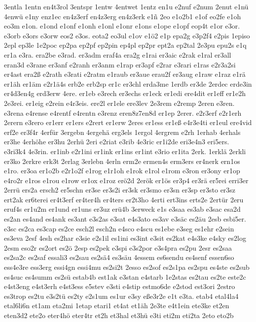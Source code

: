 {3entla
1entn
en4t3rol
3entspr
1entw
4entwet
1entz
en1u
e2nuf
e2num
2enut
e1nü
4enwü
e1ny
enz1ec
en4z3erf
en4z3erg
en4z3erk
e1ñ
2eo
e1o2b1
e1of
eo2fe
e1oh
eo3m
e1on.
e1ond
e1onf
e1onh
e1onl
e1onr
e1ons
e1ope
e1opf
eop4t
e1or
e3or.
e3orb
e3ors
e3orw
eos2
e3os.
eota2
eo3ul
e1ov
e1ö2
e1p
epa2g
e3p2f4
e2pis
1episo
2epl
ep3le
1e2poc
ep2pa
ep2pf
ep2pin
ep4pl
ep2pr
ept2a
ep2tal
2e3pu
epu2s
e1q
er1a
e3ra.
era2be
e3rad.
er3adm
eraf4a
era2g
e1rai
er3aic
e2rak
e1ral
er3all
eran3d
e3rane
er3anf
e2ranh
er3anm
e1rap
er3apf
e2rar
e3rari
e1ras
e2r3a2si
er4ast
era2ß
e2rath
e3rati
e2ratm
e1raub
er3aue
erau2f
er3aug
e1raw
e1raz
e1rä
er1äh
er1äm
e2r1ä4s
erb2e
erb2sp
er1c
er3chl
erda3me
1erdb
er3de
2erdec
erde3in
er4d3en4g
erd3erw
4ere.
er1eb
e3rech
er3echs
er1eck
er1edi
ere4dit
er1eff
er1e2h
2e3rei.
er1eig
e2rein
e4r3eis.
ere2l
er1ele
ere3lev
2e3rem
e2remp
2eren
e3ren.
e3rena
e4rense
e4rentf
e4rentn
e3renz
eren8z7en8d
er1ep
2erer.
e2r3erf
e2r1erh
2erern
e3rero
er1err
er1ers
e2rert
er1erw
2eres
er1ess
er1eß
e4r3e4ti
er1eul
ere4vid
erf2e
er3f4r
4erfür
3ergebn
4ergehä
erg3els
1ergol
4ergrem
e2rh
1erhab
4erhals
er3he
4erhöhe
er3hu
2erhü
2eri
e2riat
e3rib
4e3ric
er1i2de
eri3e4n3
eri5ers.
e3ri3k4
4e3rin.
er1inb
e2r1ini
er1ink
er1ins
er1int
e3rio
er1ita
2erk.
1erklä
2erkli
er3ko
2erkre
erk3t
2erlag
3erlebn
4erln
erm2e
ermen4s
erm3ers
er4nerk
ern1os
e1ro.
er3oa
er1o2b
e2r1o2f
e1rog
e1r1oh
e1rok
e1rol
e1rom
e3ron
er3ony
er1op
e4ro2r
e1ros
e1rou
e1row
er1ox
e1roz
erö2d
2erök
er1ös
er3p4
er3rä
er5rei
erri3er
2errü
ers2a
ersch2
er5schn
er3se
er3s2i
er3sk
er3smo
er3sn
er3sp
er3sto
er3sz
ert2ak
er6terei
er4t3erf
er4ter4h
er4ters
er2t3ho
4erti
ert3ins
erts2e
2ertür
2eru
eruf4s
er1u2m
er1und
er1uns
er3uz
erü4b
3erweck
e1s
e3saa
es3ab
e3sac
esa2d
es2an
es4and
es4ank
es3ant
e3s2as
e3sat
e4s3ato
es3av
e3säc
es2äu
2esb
esbi5er.
e3sc
es2ca
es3cap
es2ce
esch2l
esch2n
e4sco
e4scu
es1ebe
e3seg
es1ehr
e2sein
es3eva
2esf
4esh
es2har
e3sie
e2s1il
es1ini
es3int
e3sit
es2kat
e4s3ke
e4sky
es2log
2esm
eso2r
es2ort
es2ö
2esp
es2pek
e3spi
e3s2por
e3s4pra
es2pu
2esr
es2saa
es2sa2c
es2saf
essali3
es2sau
es2sä4
es3säu
4essem
es6sendu
es4senf
essen6so
ess4e3re
ess3erg
essi4gn
essi4mu
es2si2t
2esso
es2sof
es2s1pa
es2spu
es4ste
es2sub
es4suc
es4summ
es2sü
estab4b
est1ak
e3stan
e4starb
1e2stas
es2tau
es2te
este2c
e4st3eng
e4st3erh
e4st3ess
e5stev
e3sti
e4stip
estmo6de
e2stod
est3ori
2estro
es3trop
es2tu
e3s2tü
es2ty
e2s1um
es1ur
e3sy
eße3r2e
e1t
e3ta.
etab4
etal4la4
etal6li6n
et1am
eta2mi
1etap
etari1
et4at
et1äh
2e3te
e4t1ein
ete3ke
et2en
eten3d2
ete2o
eter4hö
eter4tr
et2h
et3hal
et3hü
e3ti
eti2m
eti2ta
2eto
eto2b
}
